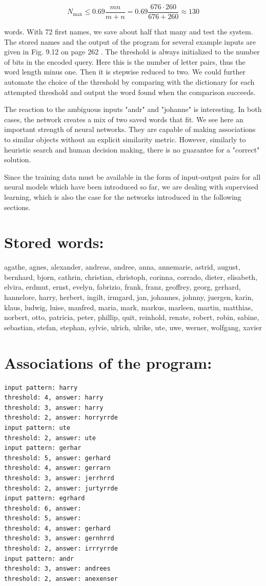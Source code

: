 \documentclass[10pt]{book}
\begin{document}
$$
N_{\max } \leq 0.69 \frac{m n}{m+n}=0.69 \frac{676 \cdot 260}{676+260} \approx 130
$$

words. With 72 first names, we save about half that many and test the system. The stored names and the output of the program for several example inputs are given in Fig. 9.12 on page 262 . The threshold is always initialized to the number of bits in the encoded query. Here this is the number of letter pairs, thus the word length minus one. Then it is stepwise reduced to two. We could further automate the choice of the threshold by comparing with the dictionary for each attempted threshold and output the word found when the comparison succeeds.

The reaction to the ambiguous inputs "andr" and "johanne" is interesting. In both cases, the network creates a mix of two saved words that fit. We see here an important strength of neural networks. They are capable of making associations to similar objects without an explicit similarity metric. However, similarly to heuristic search and human decision making, there is no guarantee for a "correct" solution.

Since the training data must be available in the form of input-output pairs for all neural models which have been introduced so far, we are dealing with supervised learning, which is also the case for the networks introduced in the following sections.

\section*{Stored words:}
agathe, agnes, alexander, andreas, andree, anna, annemarie, astrid, august, bernhard, bjorn, cathrin, christian, christoph, corinna, corrado, dieter, elisabeth, elvira, erdmut, ernst, evelyn, fabrizio, frank, franz, geoffrey, georg, gerhard, hannelore, harry, herbert, ingilt, irmgard, jan, johannes, johnny, juergen, karin, klaus, ludwig, luise, manfred, maria, mark, markus, marleen, martin, matthias, norbert, otto, patricia, peter, phillip, quit, reinhold, renate, robert, robin, sabine, sebastian, stefan, stephan, sylvie, ulrich, ulrike, ute, uwe, werner, wolfgang, xavier


\section*{Associations of the program:}
\begin{verbatim}
input pattern: harry
threshold: 4, answer: harry
threshold: 3, answer: harry
threshold: 2, answer: horryrrde
input pattern: ute
threshold: 2, answer: ute
input pattern: gerhar
threshold: 5, answer: gerhard
threshold: 4, answer: gerrarn
threshold: 3, answer: jerrhrrd
threshold: 2, answer: jurtyrrde
input pattern: egrhard
threshold: 6, answer:
threshold: 5, answer:
threshold: 4, answer: gerhard
threshold: 3, answer: gernhrrd
threshold: 2, answer: irrryrrde
input pattern: andr
threshold: 3, answer: andrees
threshold: 2, answer: anexenser
\end{verbatim}
\end{document}
